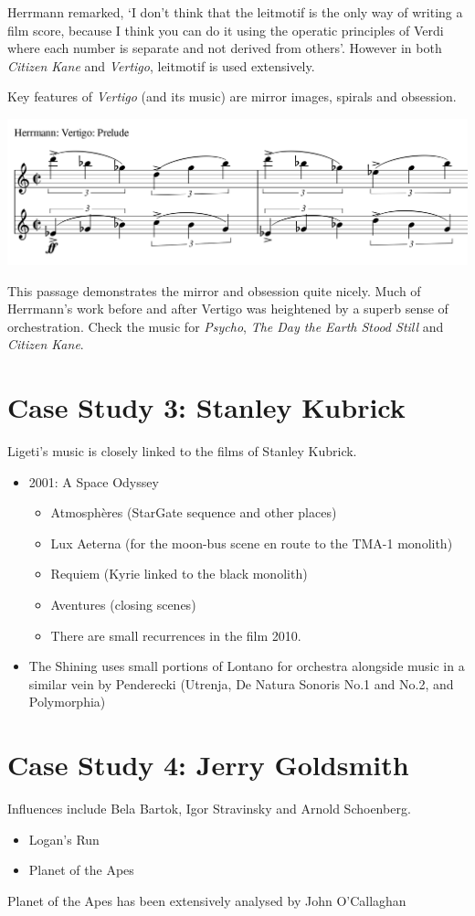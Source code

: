 \begin{itemize}
Herrmann remarked, `I don't think that the leitmotif is the only way of writing a film score, because I think you can do it using the operatic principles of Verdi where each number is separate and not derived from others'. However in both \textit{Citizen Kane} and \textit{Vertigo}, leitmotif is used extensively. 

Key features of \textit{Vertigo} (and its music) are mirror images, spirals and obsession. 

\includegraphics[scale=0.8]{herrmann-prelude}

This passage demonstrates the mirror and obsession quite nicely. Much of Herrmann's work before and after Vertigo was heightened by a superb sense of orchestration. Check the music for \textit{Psycho}, \textit{The Day the Earth Stood Still} and \textit{Citizen Kane}. 
\end{itemize}




\section{Case Study 3: Stanley Kubrick}
Ligeti's music is closely linked to the films of Stanley Kubrick. 
\begin{itemize}
\item 2001: A Space Odyssey
\begin{itemize}
\item Atmosphères (StarGate sequence and other places) 
\item Lux Aeterna (for the moon-bus scene en route to the TMA-1 monolith)
\item Requiem (Kyrie linked to the black monolith)
\item Aventures (closing scenes)
\item There are small recurrences in the film 2010.
\end{itemize}
\item The Shining uses small portions of Lontano for orchestra alongside music in a similar vein by Penderecki (Utrenja, De Natura Sonoris No.1 and No.2, and Polymorphia)
\end{itemize}

\section{Case Study 4: Jerry Goldsmith}
Influences include Bela Bartok, Igor Stravinsky and Arnold Schoenberg. 
\begin{itemize}
\item Logan's Run
\item Planet of the Apes
\end{itemize}
Planet of the Apes has been extensively analysed by John O'Callaghan \citep{o2015simians}

